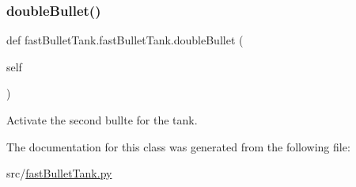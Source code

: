 \subsubsection{\texorpdfstring{doubleBullet()}{doubleBullet()}}
{\footnotesize\ttfamily def fast\+Bullet\+Tank.\+fast\+Bullet\+Tank.\+double\+Bullet (\begin{DoxyParamCaption}\item[{}]{self }\end{DoxyParamCaption})}



Activate the second bullte for the tank. 



The documentation for this class was generated from the following file\+:\begin{DoxyCompactItemize}
\item 
src/\mbox{\hyperlink{fast_bullet_tank_8py}{fast\+Bullet\+Tank.\+py}}\end{DoxyCompactItemize}
